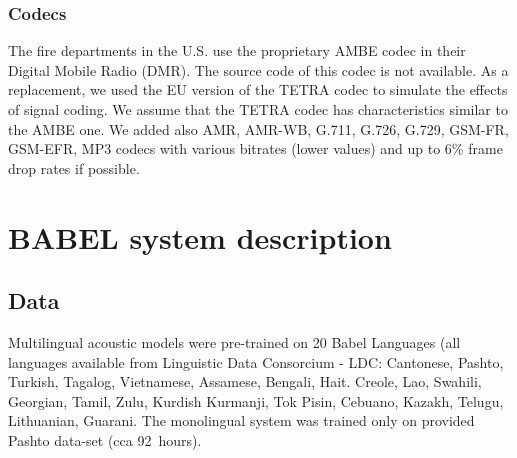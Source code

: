\documentclass{article}
\begin{document}
\subsubsection{Codecs}
The fire departments in the U.S. use the proprietary AMBE codec in
their Digital Mobile Radio (DMR). The source code of this codec is not
available. As a replacement, we used the EU version of the TETRA codec
to simulate the effects of signal coding. We assume that the TETRA
codec has characteristics similar to the AMBE one. We added also AMR, AMR-WB, G.711, G.726, G.729, GSM-FR, GSM-EFR, MP3 codecs with various bitrates (lower values) and up to $6\%$ frame drop rates if possible.




\section{BABEL system description}
\label{sec:babel}

\subsection{Data}
\label{sec:babeldata}
Multilingual acoustic models were pre-trained on 20 Babel
Languages (all languages available from Linguistic Data Consorcium - LDC:  
Cantonese, Pashto, Turkish, Tagalog, Vietnamese,
Assamese, Bengali, Hait. Creole, Lao, Swahili, Georgian, Tamil, Zulu, Kurdish Kurmanji, Tok Pisin, Cebuano, Kazakh, Telugu, Lithuanian, Guarani.
The monolingual system was trained only on provided Pashto  data-set (cca 92~hours).  
\end{document}
